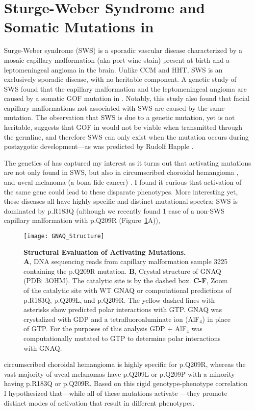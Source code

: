 \section{Sturge-Weber Syndrome and Somatic Mutations in }
Surge-Weber syndrome (SWS) is a sporadic vascular disease characterized by a mosaic capillary malformation (aka port-wine stain) present at birth and a leptomeningeal angioma in the brain. Unlike CCM and HHT, SWS is an exclusively sporadic disease, with no heritable component. A genetic study of SWS found that the capillary malformation and the leptomeningeal angioma are caused by a somatic GOF mutation in  \citep{shirley2013}. Notably, this study also found that facial capillary malformations not associated with SWS are caused by the same mutation. The observation that SWS is due to a genetic mutation, yet is not heritable, suggests that GOF in  would not be viable when transmitted through the germline, and therefore SWS can only exist when the mutation occurs during postzygotic development---as was predicted by Rudolf Happle \citep{happle1987}.

The genetics of  has captured my interest as it turns out that activating mutations are not only found in SWS, but also in circumscribed choroidal hemangioma \citep{leguin2019}, and uveal melanoma (a bona fide cancer) \citep{shoushtari2014}. I found it curious that activation of the same gene could lead to these disparate phenotypes. More interesting yet, these diseases all have highly specific and distinct  mutational spectra: SWS is dominated by p.R183Q (although we recently found 1 case of a non-SWS capillary malformation with p.Q209R (Figure~\ref{GNAQ_Structure}A)), 
\begin{figure}[bp!]
\begin{center}
\texttt{[image: GNAQ\_Structure]}
\end{center}
\caption[Structural Evaluation of Activating  Mutations]{\textbf{Structural Evaluation of Activating  Mutations.} \\ \textbf{A}, DNA sequencing reads from capillary malformation sample 3225 containing the p.Q209R mutation. \textbf{B}, Crystal structure of GNAQ (PDB: 3OHM). The catalytic site is by the dashed box. \textbf{C-F}, Zoom of the catalytic site with WT GNAQ or computational predictions of p.R183Q, p.Q209L, and p.Q209R. The yellow dashed lines with asterisks show predicted polar interactions with GTP. GNAQ was crystalized with GDP and a tetrafluoroaluminate ion (AlF$_4$) in place of GTP. For the purposes of this analysis GDP + AlF$_4$ was computationally mutated to GTP to determine polar interactions with GNAQ. }
\label{GNAQ_Structure}
\end{figure}
circumscribed choroidal hemangioma is highly specific for p.Q209R, whereas the vast majority of uveal melanomas have p.Q209L or p.Q209P with a minority having p.R183Q or p.Q209R. Based on this rigid genotype-phenotype correlation I hypothesized that---while all of these mutations activate ---they promote distinct modes of activation that result in different phenotypes. 

